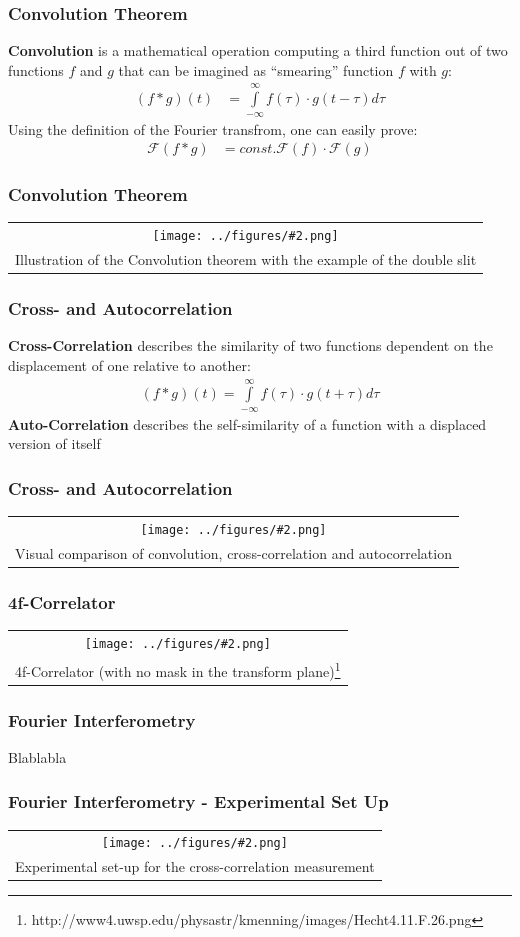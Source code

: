 \documentclass{beamer}
\newcommand{\gra}[3][]{
	\begin{table}
	\centering
	\begin{tabular}[width=\textwidth]{c}
		\texttt{[image: ../figures/\#2.png]}\\
		\small #3
	\end{tabular}
	\end{table}
}
\begin{document}
\begin{frame}
	\frametitle{Convolution Theorem}
	\textbf{Convolution} is a mathematical operation computing a third function out of two functions $f$ and $g$ that can be imagined as ``smearing'' function $f$ with $g$:
	\begin{align}
	(f*g)(t)&=\int\limits_{-\infty}^{\infty} f(\tau)\cdot g(t-\tau) d\tau
	\end{align}
	Using the definition of the Fourier transfrom, one can easily prove:
	\begin{align}
	\mathscr{F}(f*g)&=const. \mathscr{F}(f)\cdot \mathscr{F}(g)
	\end{align}
\end{frame}
\begin{frame}
	\frametitle{Convolution Theorem}
	\gra[0.7]{Convolution}{Illustration of the Convolution theorem with the example of the double slit}
\end{frame}
\begin{frame}
	\frametitle{Cross- and Autocorrelation}
\textbf{Cross-Correlation} describes the similarity of two functions dependent on the displacement of one relative to another:
	\begin{align}
	(f*g)(t)=\int\limits_{-\infty}^{\infty} f(\tau)\cdot g(t+\tau) d\tau \label{corr}
	\end{align}
\textbf{Auto-Correlation} describes the self-similarity of a function with a displaced version of itself
\end{frame}
\begin{frame}
	\frametitle{Cross- and Autocorrelation}
	\gra[0.7]{correlation}{Visual comparison of convolution, cross-correlation and autocorrelation  \footnotemark} 
\end{frame}
\begin{frame}
	\frametitle{4f-Correlator}
	\gra[0.8]{Correlator}{4f-Correlator (with no mask in the transform plane)\footnote{http://www4.uwsp.edu/physastr/kmenning/images/Hecht4.11.F.26.png}} 
\end{frame}
\begin{frame}
	\frametitle{Fourier Interferometry}
	Blablabla
\end{frame}
\begin{frame}
	\frametitle{Fourier Interferometry - Experimental Set Up}
   \gra[0.8]{Versuchsaufbau_4}{Experimental set-up for the cross-correlation measurement  \footfullcite{Bamberger}}
\end{frame}
\end{document}

